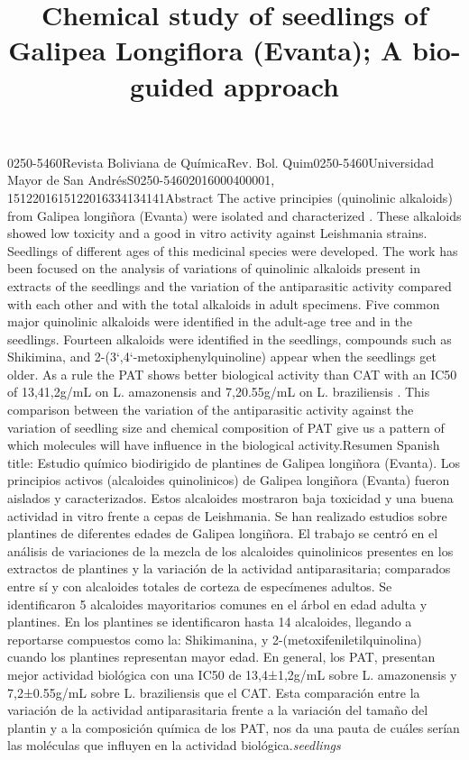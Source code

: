 \documentclass{article}
\begin{document}
\title{Chemical study of seedlings of Galipea Longiflora (Evanta); A bio-guided approach}


\maketitle

0250-5460Revista Boliviana de QuímicaRev. Bol. Quim0250-5460Universidad Mayor de San AndrésS0250-54602016000400001,  1512201615122016334134141Abstract The active principies (quinolinic alkaloids) from Galipea longiñora (Evanta) were isolated and characterized . These alkaloids showed low toxicity and a good in vitro activity against Leishmania strains. Seedlings of different ages of this medicinal species were developed. The work has been focused on the analysis of variations of quinolinic alkaloids present in extracts of the seedlings and the variation of the antiparasitic activity compared with each other and with the total alkaloids in adult specimens. Five common major quinolinic alkaloids were identified in the adult-age tree and in the seedlings. Fourteen alkaloids were identified in the seedlings, compounds such as Shikimina, and 2-(3`,4`-metoxiphenylquinoline) appear when the seedlings get older. As a rule the PAT shows better biological activity than CAT with an IC50 of 13,41,2g/mL on L. amazonensis and 7,20.55g/mL on L. braziliensis . This comparison between the variation of the antiparasitic activity against the variation of seedling size and chemical composition of PAT give us a pattern of which molecules will have influence in the biological activity.Resumen Spanish title: Estudio químico biodirigido de plantines de Galipea longiñora (Evanta). Los principios activos (alcaloides quinolinicos) de Galipea longiñora (Evanta) fueron aislados y caracterizados. Estos alcaloides mostraron baja toxicidad y una buena actividad in vitro frente a cepas de Leishmania. Se han realizado estudios sobre plantines de diferentes edades de Galipea longiñora. El trabajo se centró en el análisis de variaciones de la mezcla de los alcaloides quinolinicos presentes en los extractos de plantines y la variación de la actividad antiparasitaria; comparados entre sí y con alcaloides totales de corteza de especímenes adultos. Se identificaron 5 alcaloides mayoritarios comunes en el árbol en edad adulta y plantines. En los plantines se identificaron hasta 14 alcaloides, llegando a reportarse compuestos como la: Shikimanina, y 2-(metoxifeniletilquinolina) cuando los plantines representan mayor edad. En general, los PAT, presentan mejor actividad biológica con una IC50 de 13,4±1,2g/mL sobre L. amazonensis y 7,2±0.55g/mL sobre L. braziliensis que el CAT. Esta comparación entre la variación de la actividad antiparasitaria frente a la variación del tamaño del plantin y a la composición química de los PAT, nos da una pauta de cuáles serían las moléculas que influyen en la actividad biológica.\textit{seedlings}
\end{document}
